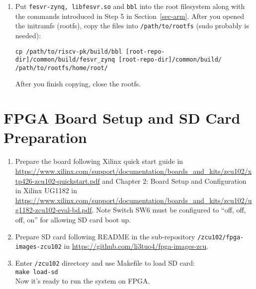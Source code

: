 \documentclass[a4paper,11pt]{article}
\begin{document}
\begin{enumerate}
\item Put {\tt fesvr-zynq, libfesvr.so} and {\tt bbl} into the root filesystem along with the commands introduced in Step 5 in Section~\ref{sec-arm}.
After you opened the initramfs (rootfs), copy the files into \texttt{/path/to/rootfs} (sudo probably is needed):
\begin{lstlisting}
cp /path/to/riscv-pk/build/bbl [root-repo-dir]/common/build/fesvr_zynq [root-repo-dir]/common/build/ /path/to/rootfs/home/root/
\end{lstlisting}
After you finish copying, close the rootfs.

\end{enumerate}

\section{FPGA Board Setup and SD Card Preparation}
\begin{enumerate}
\item Prepare the board following Xilinx quick start guide in \url{https://www.xilinx.com/support/documentation/boards_and_kits/zcu102/xtp426-zcu102-quickstart.pdf} and Chapter 2: Board Setup and Configuration in Xilinx UG1182 in \url{https://www.xilinx.com/support/documentation/boards_and_kits/zcu102/ug1182-zcu102-eval-bd.pdf}. Note Switch SW6 must be configured to ``off, off, off, on'' for allowing SD card boot up.
\item Prepare SD card following README in the sub-repository {\tt \rootdir/zcu102/fpga-images-zcu102} in \url{https://github.com/li3tuo4/fpga-images-zcu}.
\item Enter {\tt \rootdir/zcu102} directory and use Makefile to load SD card:\\
{\tt make load-sd}\\
Now it's ready to run the system on FPGA.
\end{enumerate}
\end{document}
